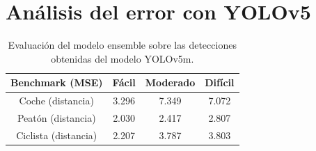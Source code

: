 \section{Análisis del error con YOLOv5}
\label{sec:Análisis del error con YOLOv5}

\begin{table}[H]
\centering
\begin{tabular}{|c|c|c|c|}
\hline
\textbf{Benchmark (MSE)} & \textbf{Fácil} & \textbf{Moderado} & \textbf{Difícil}\\ \hline \hline
Coche (distancia)        & 3.296          & 7.349             & 7.072\\ \hline
Peatón (distancia)       & 2.030          & 2.417             & 2.807\\ \hline
Ciclista (distancia)     & 2.207          & 3.787             & 3.803\\ \hline
\end{tabular}
\caption{Evaluación del modelo ensemble sobre las detecciones obtenidas del modelo YOLOv5m.}
\label{fig:Evaluación del modelo ensemble sobre las detecciones obtenidas del modelo YOLOv5m.}
\end{table}
